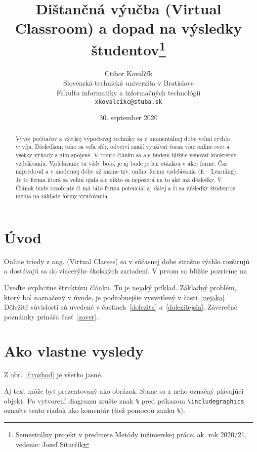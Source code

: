 \documentclass[10pt,twoside,slovak,a4paper]{article}
\title{Dištančná výučba (Virtual Classroom) a dopad na výsledky študentov\thanks{Semestrálny projekt v predmete Metódy inžinierskej práce, ak. rok 2020/21, vedenie: Jozef Sitarčík}} %
\author{Ctibor Kovalčík\\[2pt]
	{\small Slovenská technická univerzita v Bratislave}\\
	{\small Fakulta informatiky a informačných technológií}\\
	{\small \texttt{xkovalcikc@stuba.sk}}
	}
\date{\small 30. september 2020} %
\begin{document}
\maketitle

\begin{abstract}
Vývoj počítačov a všetkej výpočtovej techniky sa v momentálnej dobe veľmi rýchlo vyvíja. Dôsledkom toho sa veľa sfér, odvetví snaží využívať čoraz viac online svet a všetky výhody s ním spojené. V tomto článku sa ale budem bližšie venovať konkrétne vzdelávaniu. Vzdelávanie tu vždy bolo, je aj bude je len otázkou v akej forme. Čas napredoval a v modernej dobe už máme tzv. online formu vzdelávania (E – Learning). Je to forma ktorá sa veľmi ujala ale nikto sa nepozerá na to aké má dôsledky. V Článok bude rozobraté či má táto forma potenciál aj ďalej a či sa výsledky študentov menia na základe formy vyučovania 
\end{abstract}



\section{Úvod}

Online triedy z ang. (Virtual Classes) sa v súčasnej dobe strašne rýchlo rozširujú a dostávajú sa do viacerýhc školských zariadení.
V prvom sa bližšie pozrieme na

Uveďte explicitne štruktúru článku. Tu je nejaký príklad.
Základný problém, ktorý bol naznačený v úvode, je podrobnejšie vysvetlený v časti~\ref{nejaka}.
Dôležité súvislosti sú uvedené v častiach~\ref{dolezita} a~\ref{dolezitejsia}.
Záverečné poznámky prináša časť~\ref{zaver}.



\section{Ako vlastne vysledy} \label{2}

Z obr.~\ref{f:rozhod} je všetko jasné. 

\begin{figure*}[tbh]
\centering
Aj text môže byť prezentovaný ako obrázok. Stane sa z neho označný plávajúci objekt. Po vytvorení diagramu zrušte znak \texttt{\%} pred príkazom \verb|\includegraphics| označte tento riadok ako komentár (tiež pomocou znaku \texttt{\%}).
\caption{Rozhodujúci argument.}
\label{f:rozhod}
\end{figure*}
\end{document}
